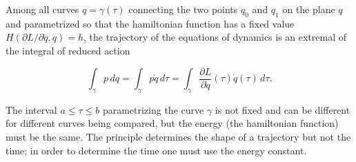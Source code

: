 Among all curves $q = \gamma(\tau)$ connecting the two points $q_0$ and $q_1$ on the plane $q$ and parametrized so that the hamiltonian function has a fixed value $H(\partial L/\partial \dot{q}, q) = h$, the trajectory of the equations of dynamics is an extremal of the integral of reduced action

$$\int_{\gamma} p \, dq = \int_{\gamma} p \dot{q} \, d\tau = \int_{\gamma} \frac{\partial L}{\partial \dot{q}}(\tau) \dot{q}(\tau) \, d\tau.$$

The interval $a \leq \tau \leq b$ parametrizing the curve $\gamma$ is not fixed and can be different for different curves being compared, but the energy (the hamiltonian function) must be the same. The principle determines the shape of a trajectory but not the time; in order to determine the time one must use the energy constant.

